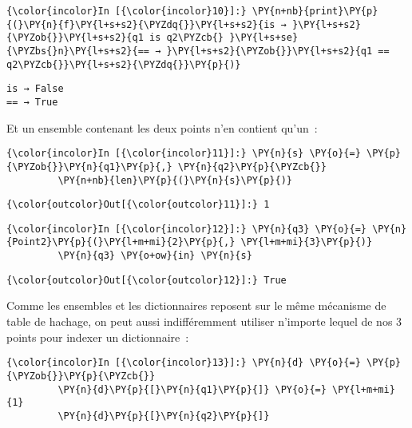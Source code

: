     \begin{Verbatim}[commandchars=\\\{\}]
{\color{incolor}In [{\color{incolor}10}]:} \PY{n+nb}{print}\PY{p}{(}\PY{n}{f}\PY{l+s+s2}{\PYZdq{}}\PY{l+s+s2}{is → }\PY{l+s+s2}{\PYZob{}}\PY{l+s+s2}{q1 is q2\PYZcb{} }\PY{l+s+se}{\PYZbs{}n}\PY{l+s+s2}{== → }\PY{l+s+s2}{\PYZob{}}\PY{l+s+s2}{q1 == q2\PYZcb{}}\PY{l+s+s2}{\PYZdq{}}\PY{p}{)}
\end{Verbatim}


    \begin{Verbatim}[commandchars=\\\{\}]
is → False 
== → True

    \end{Verbatim}

    Et un ensemble contenant les deux points n'en contient qu'un~:

    \begin{Verbatim}[commandchars=\\\{\}]
{\color{incolor}In [{\color{incolor}11}]:} \PY{n}{s} \PY{o}{=} \PY{p}{\PYZob{}}\PY{n}{q1}\PY{p}{,} \PY{n}{q2}\PY{p}{\PYZcb{}}
         \PY{n+nb}{len}\PY{p}{(}\PY{n}{s}\PY{p}{)}
\end{Verbatim}


\begin{Verbatim}[commandchars=\\\{\}]
{\color{outcolor}Out[{\color{outcolor}11}]:} 1
\end{Verbatim}
            
    \begin{Verbatim}[commandchars=\\\{\}]
{\color{incolor}In [{\color{incolor}12}]:} \PY{n}{q3} \PY{o}{=} \PY{n}{Point2}\PY{p}{(}\PY{l+m+mi}{2}\PY{p}{,} \PY{l+m+mi}{3}\PY{p}{)}
         \PY{n}{q3} \PY{o+ow}{in} \PY{n}{s}
\end{Verbatim}


\begin{Verbatim}[commandchars=\\\{\}]
{\color{outcolor}Out[{\color{outcolor}12}]:} True
\end{Verbatim}
            
    Comme les ensembles et les dictionnaires reposent sur le même mécanisme
de table de hachage, on peut aussi indifféremment utiliser n'importe
lequel de nos 3 points pour indexer un dictionnaire~:

    \begin{Verbatim}[commandchars=\\\{\}]
{\color{incolor}In [{\color{incolor}13}]:} \PY{n}{d} \PY{o}{=} \PY{p}{\PYZob{}}\PY{p}{\PYZcb{}}
         \PY{n}{d}\PY{p}{[}\PY{n}{q1}\PY{p}{]} \PY{o}{=} \PY{l+m+mi}{1}
         \PY{n}{d}\PY{p}{[}\PY{n}{q2}\PY{p}{]}
\end{Verbatim}


